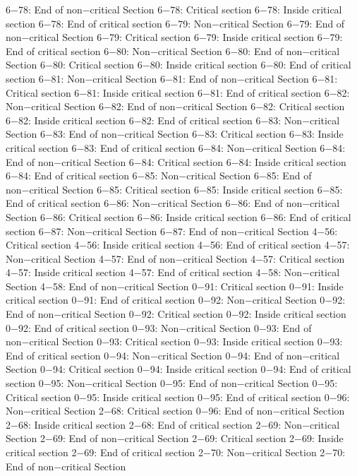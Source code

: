 6−78: End of non−critical Section
6−78: Critical section
6−78: Inside critical section
6−78: End of critical section
6−79: Non−critical Section
6−79: End of non−critical Section
6−79: Critical section
6−79: Inside critical section
6−79: End of critical section
6−80: Non−critical Section
6−80: End of non−critical Section
6−80: Critical section
6−80: Inside critical section
6−80: End of critical section
6−81: Non−critical Section
6−81: End of non−critical Section
6−81: Critical section
6−81: Inside critical section
6−81: End of critical section
6−82: Non−critical Section
6−82: End of non−critical Section
6−82: Critical section
6−82: Inside critical section
6−82: End of critical section
6−83: Non−critical Section
6−83: End of non−critical Section
6−83: Critical section
6−83: Inside critical section
6−83: End of critical section
6−84: Non−critical Section
6−84: End of non−critical Section
6−84: Critical section
6−84: Inside critical section
6−84: End of critical section
6−85: Non−critical Section
6−85: End of non−critical Section
6−85: Critical section
6−85: Inside critical section
6−85: End of critical section
6−86: Non−critical Section
6−86: End of non−critical Section
6−86: Critical section
6−86: Inside critical section
6−86: End of critical section
6−87: Non−critical Section
6−87: End of non−critical Section
4−56: Critical section
4−56: Inside critical section
4−56: End of critical section
4−57: Non−critical Section
4−57: End of non−critical Section
4−57: Critical section
4−57: Inside critical section
4−57: End of critical section
4−58: Non−critical Section
4−58: End of non−critical Section
0−91: Critical section
0−91: Inside critical section
0−91: End of critical section
0−92: Non−critical Section
0−92: End of non−critical Section
0−92: Critical section
0−92: Inside critical section
0−92: End of critical section
0−93: Non−critical Section
0−93: End of non−critical Section
0−93: Critical section
0−93: Inside critical section
0−93: End of critical section
0−94: Non−critical Section
0−94: End of non−critical Section
0−94: Critical section
0−94: Inside critical section
0−94: End of critical section
0−95: Non−critical Section
0−95: End of non−critical Section
0−95: Critical section
0−95: Inside critical section
0−95: End of critical section
0−96: Non−critical Section
2−68: Critical section
0−96: End of non−critical Section
2−68: Inside critical section
2−68: End of critical section
2−69: Non−critical Section
2−69: End of non−critical Section
2−69: Critical section
2−69: Inside critical section
2−69: End of critical section
2−70: Non−critical Section
2−70: End of non−critical Section
